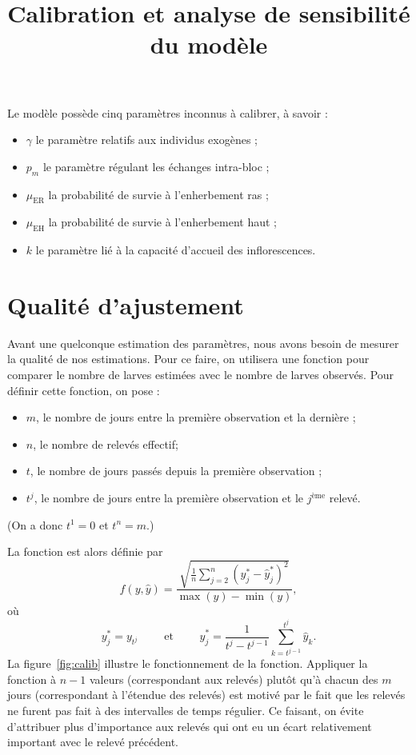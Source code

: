 \documentclass[a4paper, 11pt]{article}
\title{Calibration et analyse de sensibilité du modèle}
\author{}
\date{}
\begin{document}
\maketitle

Le modèle possède cinq paramètres inconnus à calibrer, à savoir :
\begin{itemize}
 \item $\gamma$ le paramètre relatifs aux individus exogènes ;
 \item $p_m$ le paramètre régulant les échanges intra-bloc ;
 \item $\mu_{\text{ER}}$ la probabilité de survie à l'enherbement ras ;
 \item $\mu_{\text{EH}}$ la probabilité de survie à l'enherbement haut ;
 \item $k$ le paramètre lié à la capacité d'accueil des inflorescences.
\end{itemize}

\section{Qualité d'ajustement}

Avant une quelconque estimation des paramètres, nous avons besoin de mesurer la qualité de nos estimations. Pour ce faire, on utilisera une fonction pour comparer le nombre de larves estimées avec le nombre de larves observés. Pour définir cette fonction, on pose :
\begin{itemize}
 \item $m$, le nombre de jours entre la première observation et la dernière ;
 \item $n$, le nombre de relevés effectif;
 \item $t$, le nombre de jours passés depuis la première observation ;
 \item $t^j$, le nombre de jours entre la première observation et le $j^{\text{ème}}$ relevé.
\end{itemize}
(On a donc $t^1 = 0$ et $t^n = m$.)

La fonction est alors définie par
$$
f(y, \hat y) = \frac{\sqrt{\frac{1}{n}\sum_{j=2}^n\left( y^*_j - \hat y^*_j \right)^2}}{\max(y) - \min(y)},
$$
où 
$$y^*_j =  y_{t^j} \qquad \text{ et } \qquad \hat y^*_j = \frac{1}{t^j - t^{j-1}}\sum_{k=t^{j-1}}^{t^j} \hat y_k.$$
La figure~\ref{fig:calib} illustre le fonctionnement de la fonction. Appliquer la fonction à $n-1$ valeurs (correspondant aux relevés) plutôt qu'à chacun des $m$ jours (correspondant à l'étendue des relevés) est motivé par le fait que les relevés ne furent pas fait à des intervalles de temps régulier. Ce faisant, on évite d'attribuer plus d'importance aux relevés qui ont eu un écart relativement important avec le relevé précédent.
\end{document}
